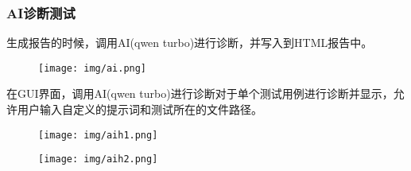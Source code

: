 \documentclass{article}
\begin{document}
\subsubsection{AI诊断测试}
生成报告的时候，调用AI(qwen turbo)进行诊断，并写入到HTML报告中。
\begin{figure}[H]
    \centering
    \texttt{[image: img/ai.png]}
\end{figure}
在GUI界面，调用AI(qwen turbo)进行诊断对于单个测试用例进行诊断并显示，允许用户输入自定义的提示词和测试所在的文件路径。
\begin{figure}[H]
    \centering
    \begin{minipage}{0.45\textwidth}
        \texttt{[image: img/aih1.png]}
    \end{minipage}
    \hfill
    \begin{minipage}{0.45\textwidth}
        \texttt{[image: img/aih2.png]}
    \end{minipage}
\end{figure}
\end{document}
